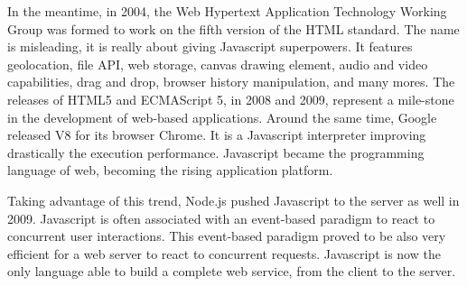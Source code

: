 
In the meantime, in 2004, the Web Hypertext Application Technology Working Group was formed to work on the fifth version of the HTML standard.
The name is misleading, it is really about giving Javascript superpowers.
It features geolocation, file API, web storage, canvas drawing element, audio and video capabilities, drag and drop, browser history manipulation, and many mores.
The releases of HTML5 and ECMAScript 5, in 2008 and 2009, represent a mile-stone in the development of web-based applications.
Around the same time, Google released V8 for its browser Chrome.
It is a Javascript interpreter improving drastically the execution performance. %
Javascript became the programming language of web, becoming the rising application platform.

Taking advantage of this trend, Node.js pushed Javascript to the server as well in 2009.
Javascript is often associated with an event-based paradigm to react to concurrent user interactions.
This event-based paradigm proved to be also very efficient for a web server to react to concurrent requests.
Javascript is now the only language able to build a complete web service, from the client to the server.





